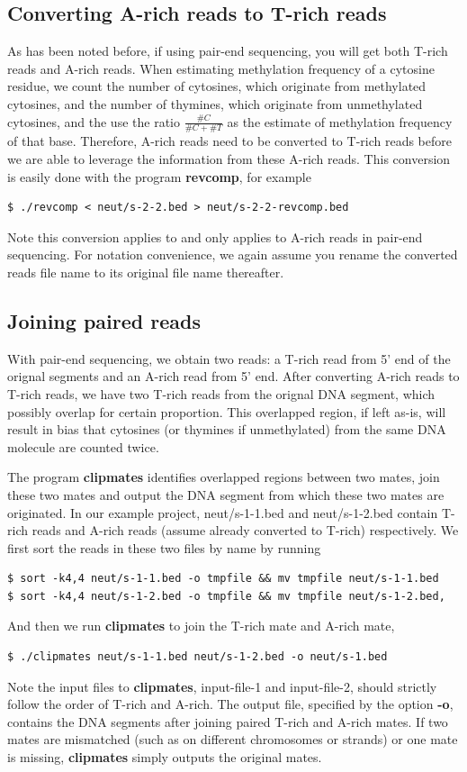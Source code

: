 \documentclass{article}
\begin{document}
\subsection{Converting A-rich reads to T-rich reads}
\label{sec:conv-rich-reads}
As has been noted before, if using pair-end sequencing, you will get
both T-rich reads and A-rich reads. When estimating methylation
frequency of a cytosine residue, we count the number of cytosines,
which originate from methylated cytosines, and the number of thymines,
which originate from unmethylated cytosines, and the use the ratio
$\frac{\#C}{\#C+\#T}$ as the estimate of methylation frequency of that
base. Therefore, A-rich reads need to be converted to T-rich reads
before we are able to leverage the information from these A-rich
reads. This conversion is easily done with the program
\textbf{revcomp}, for example  
\begin{verbatim}
$ ./revcomp < neut/s-2-2.bed > neut/s-2-2-revcomp.bed
\end{verbatim}
Note this conversion applies to and only applies to A-rich reads in
pair-end sequencing. For notation convenience, we again assume you
rename the converted reads file name to its original file name
thereafter.

\subsection{Joining paired reads}
\label{sec:mask-overl-regi}
With pair-end sequencing, we obtain two reads: a T-rich read from 5'
end of the orignal segments and an A-rich read from 5' end. After
converting A-rich reads to T-rich reads, we have two T-rich reads from
the orignal DNA segment, which possibly overlap for certain
proportion. This overlapped region, if left as-is, will result in bias
that cytosines (or thymines if unmethylated) from the same DNA
molecule are counted twice.

The program \textbf{clipmates} identifies overlapped regions between
two mates, join these two mates and output the DNA segment from which
these two mates are originated. In our example project, neut/s-1-1.bed
and neut/s-1-2.bed contain T-rich reads and A-rich reads (assume
already converted to T-rich) respectively. We first sort the reads in
these two files by name by running
\begin{verbatim}
$ sort -k4,4 neut/s-1-1.bed -o tmpfile && mv tmpfile neut/s-1-1.bed
$ sort -k4,4 neut/s-1-2.bed -o tmpfile && mv tmpfile neut/s-1-2.bed,
\end{verbatim}
And then we run \textbf{clipmates} to join the T-rich mate and A-rich
mate, 
\begin{verbatim}
$ ./clipmates neut/s-1-1.bed neut/s-1-2.bed -o neut/s-1.bed
\end{verbatim}
Note the input files to \textbf{clipmates}, input-file-1 and
input-file-2, should strictly follow the order of T-rich and
A-rich. The output file, specified by the option \textbf{-o}, contains
the DNA segments after joining paired T-rich and A-rich mates. If two
mates are mismatched (such as on different chromosomes or strands) or
one mate is missing, \textbf{clipmates} simply outputs the original
mates. 
\end{document}
